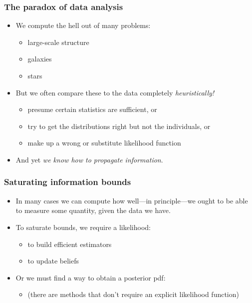 \documentclass[pdftex]{beamer}
\begin{document}
\begin{frame}
  \frametitle{The paradox of data analysis}
  \begin{itemize}
  \item We compute the hell out of many problems:
    \begin{itemize}
    \item large-scale structure
    \item galaxies
    \item stars
    \end{itemize}
  \item But we often compare these to the data completely \emph{heuristically!}
    \begin{itemize}
    \item presume certain statistics are sufficient, or
    \item try to get the distributions right but not the individuals, or
    \item make up a wrong or substitute likelihood function
    \end{itemize}
  \item And yet \emph{we know how to propagate information}.
  \end{itemize}
\end{frame}

\begin{frame}
  \frametitle{Saturating information bounds}
  \begin{itemize}
  \item In many cases we can compute how well---in principle---we ought to be able to
    measure some quantity, given the data we have.
  \item To saturate bounds, we require a likelihood:
    \begin{itemize}
    \item to build efficient estimators
    \item to update beliefs
    \end{itemize}
  \item Or we must find a way to obtain a posterior pdf:
    \begin{itemize}
    \item (there are methods that don't require an explicit likelihood function)
    \end{itemize}
  \end{itemize}
\end{frame}
\end{document}
